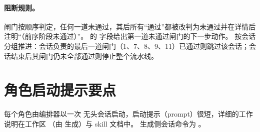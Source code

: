 \paragraph{阻断规则。}
闸门按顺序判定，任何一道未通过，其后所有“通过”都被改判为未通过并在详情后注明“（前序阶段未通过）”。 的  字段给出第一道未通过闸门的下一步动作。
 按会话分组推进：会话负责的最后一道闸门（1、7、8、9、11）已通过则跳过该会话；会话结束后其闸门仍未全部通过则停止整个流水线。

\section{角色启动提示要点}
\label{app:prompts}

每个角色由编排器以一次  无头会话启动，启动提示（prompt）很短，详细的工作说明在工作区 （由  生成）与 skill 文档中。
生成侧会话命令为 。

